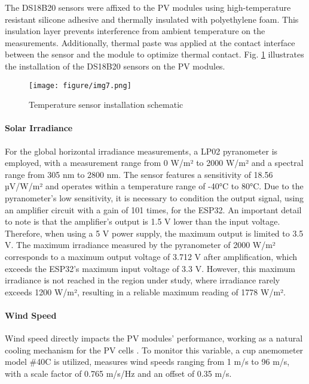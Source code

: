 The DS18B20 sensors were affixed to the PV modules using high-temperature resistant silicone adhesive and thermally insulated with polyethylene foam. This insulation layer prevents interference from ambient temperature on the measurements. Additionally, thermal paste was applied at the contact interface between the sensor and the module to optimize thermal contact. Fig. \ref{fig:tuboSensor}  illustrates the installation of the DS18B20 sensors on the PV modules.


\begin{figure}[h]
    \centering
    \texttt{[image: figure/img7.png]}
    \caption{Temperature sensor installation schematic}
    \label{fig:tuboSensor}
\end{figure}

\paragraph{Solar Irradiance}

For the global horizontal irradiance measurements, a LP02 pyranometer is employed, with a measurement range from 0 W/m² to 2000 W/m² and a spectral range from 305 nm to 2800 nm. The sensor features a sensitivity of 18.56 µV/W/m² and operates within a temperature range of -40°C to 80°C. Due to the pyranometer's low sensitivity, it is necessary to condition the output signal, using an amplifier circuit with a gain of 101 times, for the ESP32.
%
An important detail to note is that the amplifier's output is 1.5 V lower than the input voltage. Therefore, when using a 5 V power supply, the maximum output is limited to 3.5 V. The maximum irradiance measured by the pyranometer of 2000 W/m² corresponds to a maximum output voltage of 3.712 V after amplification, which exceeds the ESP32’s maximum input voltage of 3.3 V. However, this maximum irradiance is not reached in the region under study, where irradiance rarely exceeds 1200 W/m², resulting in a reliable maximum reading of 1778 W/m².


\paragraph{Wind Speed}

Wind speed directly impacts the  PV modules' performance, working as a natural cooling mechanism for the PV cells \cite{neto2021the}. To monitor this variable, a cup anemometer model \#40C is utilized, measures wind speeds ranging from 1 m/s to 96 m/s, with a scale factor of 0.765 m/s/Hz and an offset of 0.35 m/s.

